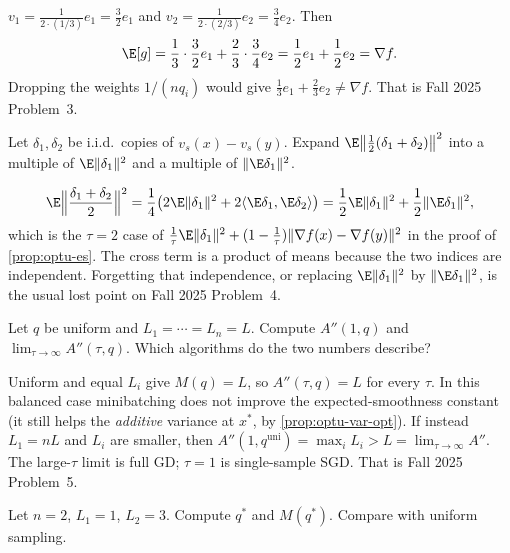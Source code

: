 \begin{solution}[Check unbiasedness on $n=2$]
$v_1=\frac1{2\cdot(1/3)}e_1=\frac32 e_1$ and $v_2=\frac1{2\cdot(2/3)}e_2=\frac34 e_2$. Then
\[
\E[g]
=
\frac13\cdot\frac32 e_1+\frac23\cdot\frac34 e_2
=
\frac12 e_1+\frac12 e_2
=
\nabla f.
\]
Dropping the weights $1/(n q_i)$ would give $\frac13 e_1+\frac23 e_2\neq\nabla f$. That is Fall 2025 Problem~3.
\end{solution}

\begin{exercise}
\label{ex:optu-expand}
Let $\delta_1,\delta_2$ be i.i.d.\ copies of $v_s(x)-v_s(y)$. Expand $\E\bigl\|\frac12(\delta_1+\delta_2)\bigr\|^2$ into a multiple of $\E\|\delta_1\|^2$ and a multiple of $\|\E\delta_1\|^2$.
\end{exercise}

\begin{solution}
\[
\E\Bigl\|\frac{\delta_1+\delta_2}2\Bigr\|^2
=
\frac14\bigl(2\E\|\delta_1\|^2+2\langle\E\delta_1,\E\delta_2\rangle\bigr)
=
\frac12\E\|\delta_1\|^2+\frac12\|\E\delta_1\|^2,
\]
which is the $\tau=2$ case of $\frac1\tau\E\|\delta_1\|^2+(1-\frac1\tau)\|\nabla f(x)-\nabla f(y)\|^2$ in the proof of \cref{prop:optu-es}. The cross term is a product of means because the two indices are independent. Forgetting that independence, or replacing $\E\|\delta_1\|^2$ by $\|\E\delta_1\|^2$, is the usual lost point on Fall 2025 Problem~4.
\end{solution}

\begin{exercise}
\label{ex:optu-endpoints}
Let $q$ be uniform and $L_1=\cdots=L_n=L$. Compute $A''(1,q)$ and $\lim_{\tau\to\infty}A''(\tau,q)$. Which algorithms do the two numbers describe?
\end{exercise}

\begin{solution}
Uniform and equal $L_i$ give $M(q)=L$, so $A''(\tau,q)=L$ for every $\tau$. In this balanced case minibatching does not improve the expected-smoothness constant (it still helps the \emph{additive} variance at $x^*$, by \cref{prop:optu-var-opt}). If instead $L_1=nL$ and $L_i$ are smaller, then $A''(1,q^{\mathrm{uni}})=\max_i L_i>L=\lim_{\tau\to\infty}A''$. The large-$\tau$ limit is full GD; $\tau=1$ is single-sample SGD. That is Fall 2025 Problem~5.
\end{solution}

\begin{exercise}
\label{ex:optu-q}
Let $n=2$, $L_1=1$, $L_2=3$. Compute $q^*$ and $M(q^*)$. Compare with uniform sampling.
\end{exercise}

